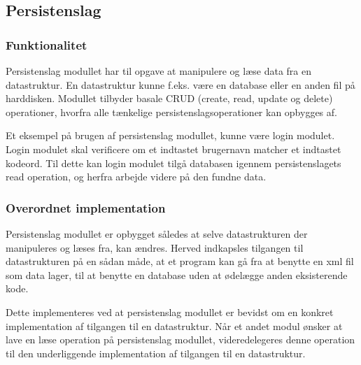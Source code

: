 \subsection{Persistenslag}
\label{sub:persistenslag}

\subsubsection{Funktionalitet}
\label{ssub:Funktionalitet}

Persistenslag modullet har til opgave at manipulere og læse data fra en datastruktur. En datastruktur kunne f.eks. være en database eller en anden fil på harddisken. Modullet tilbyder basale CRUD (create, read, update og delete) operationer, hvorfra alle tænkelige persistenslagsoperationer kan opbygges af.

Et eksempel på brugen af persistenslag modullet, kunne være login modulet. Login modulet skal verificere om et indtastet brugernavn matcher et indtastet kodeord. Til dette kan login modulet tilgå databasen igennem persistenslagets read operation, og herfra arbejde videre på den fundne data.


\subsubsection{Overordnet implementation}
\label{ssub:Implementation}


Persistenslag modullet er opbygget således at selve datastrukturen der manipuleres og læses fra, kan ændres. Herved indkapsles tilgangen til datastrukturen på en sådan måde, at et program kan gå fra at benytte en xml fil som data lager, til at benytte en database uden at ødelægge anden eksisterende kode.

Dette implementeres ved at persistenslag modullet er bevidst om en konkret implementation af tilgangen til en datastruktur. Når et andet modul ønsker at lave en læse operation på persistenslag modullet, videredelegeres denne operation til den underliggende implementation af tilgangen til en datastruktur.
